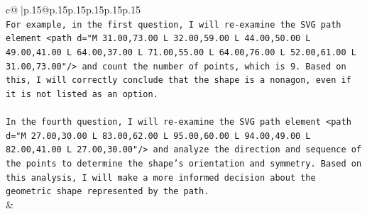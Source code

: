 \documentclass{article}
\begin{document}
{\begin{supertabular}{c@{$\;$}|p{.15\linewidth}@{}p{.15\linewidth}p{.15\linewidth}p{.15\linewidth}p{.15\linewidth}p{.15\linewidth}}
{{{\\ 
\texttt{For example, in the first question, I will re{-}examine the SVG path element <path d="M 31.00,73.00 L 32.00,59.00 L 44.00,50.00 L 49.00,41.00 L 64.00,37.00 L 71.00,55.00 L 64.00,76.00 L 52.00,61.00 L 31.00,73.00"/> and count the number of points, which is 9. Based on this, I will correctly conclude that the shape is a nonagon, even if it is not listed as an option.} \\
\\ 
\texttt{In the fourth question, I will re{-}examine the SVG path element <path d="M 27.00,30.00 L 83.00,62.00 L 95.00,60.00 L 94.00,49.00 L 82.00,41.00 L 27.00,30.00"/> and analyze the direction and sequence of the points to determine the shape's orientation and symmetry. Based on this analysis, I will make a more informed decision about the geometric shape represented by the path.} \\
            }
        }
    }
    & \\ \\

\end{supertabular}
}
\end{document}
